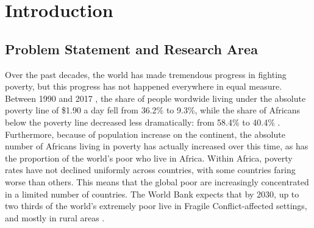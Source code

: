 \pagestyle{fancy}
\chapter{Introduction}



\section{Problem Statement and Research Area}




Over the past decades, the world has made tremendous progress in fighting poverty, but this progress has not happened everywhere in equal measure. Between 1990 and 2017 , the share of people wordwide living under the absolute poverty line of \$1.90 a day fell from 36.2\% to 9.3\%, while the share of Africans below the poverty line decreased less dramatically: from 58.4\% to 40.4\% \citep{WorldBank2021}. Furthermore, because of population increase on the continent, the absolute number of Africans living in poverty has actually increased over this time, as has the proportion of the world's poor who live in Africa. Within Africa, poverty rates have not declined uniformly across countries, with some countries faring worse than others. This means that the global poor are increasingly concentrated in a limited number of countries. The World Bank expects that by 2030, up to two thirds of the world's extremely poor live in Fragile Conflict-affected settings, and mostly in rural areas \citep{WorldBank2019}. %


